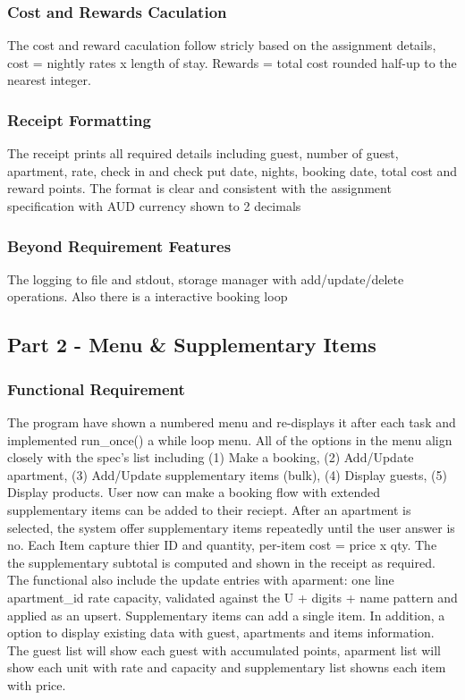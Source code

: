 \documentclass[conference]{IEEEtran}
\begin{document}
\subsubsection{Cost and Rewards Caculation}
The cost and reward caculation follow stricly based on the assignment details, cost = nightly rates x length of stay. Rewards = total cost rounded half-up to the nearest integer.
\subsubsection{Receipt Formatting}
The receipt prints all required details including guest, number of guest, apartment, rate, check in and check put date, nights, booking date, total cost and reward points. The format is clear and consistent with the assignment specification with AUD currency shown to 2 decimals
\subsubsection{Beyond Requirement Features}
The logging to file and stdout, storage manager with add/update/delete operations. Also there is a interactive booking loop 
\subsection{Part 2 - Menu \& Supplementary Items}
\subsubsection{Functional Requirement}
The program have shown a numbered menu and re-displays it after each task and implemented run\_once() a while loop menu. All of the options in the menu align closely with the spec's list including (1) Make a booking, (2) Add/Update apartment, (3) Add/Update supplementary items (bulk), (4) Display guests, (5) Display products. User now can make a booking flow with extended supplementary items can be added to their reciept. After an apartment is selected, the system offer supplementary items repeatedly until the user answer is no. Each Item capture thier ID and quantity, per-item cost = price x qty. The the supplementary subtotal is computed and shown in the receipt as required. The functional also include the update entries with aparment: one line apartment\_id rate capacity, validated against the U + digits + name pattern and applied as an upsert. Supplementary items can add a single item. In addition, a option to display existing data with guest, apartments and items information. The guest list will show each guest with accumulated points, aparment list will show each unit with rate and capacity and supplementary list showns each item with price.
\end{document}
